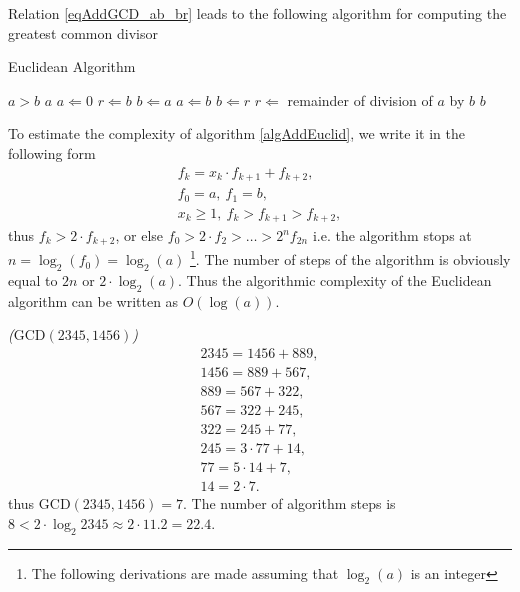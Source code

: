 Relation \eqref{eqAddGCD_ab_br} leads to the following algorithm
for computing the greatest common divisor
\begin{algorithm}
\caption{Euclidean Algorithm}
\begin{algorithmic}
    \STATE $a > b$
        \RETURN $a$
    \ENDIF
    \STATE $a \Leftarrow 0$
    \STATE $r \Leftarrow b$
    \STATE $b \Leftarrow a$
    \REPEAT
        \STATE $a \Leftarrow b$
        \STATE $b \Leftarrow r$
        \STATE $r \Leftarrow $ remainder of division of $a$ by $b$
    \RETURN $b$
\end{algorithmic}
\label{algAddEuclid}
\end{algorithm}

To estimate the complexity of algorithm \ref{algAddEuclid}, we write it in the following form 
\begin{eqnarray}
f_k = x_k \cdot f_{k + 1} + f_{k + 2},
\nonumber \\
f_0 = a, \: f_1 = b,
\nonumber \\
x_k \ge 1, \: f_k > f_{k+1} > f_{k + 2},
\nonumber
\end{eqnarray}
thus $f_k > 2 \cdot f_{k + 2}$, or else
$f_0 > 2 \cdot f_2 > \dots > 2^nf_{2n}$ i.e. the algorithm stops at
$n = \log_2\left(f_0\right) = \log_2\left(a\right)$
\footnote{The following derivations are made assuming that
  $\log_2\left(a\right)$ is an integer}. The number of steps
of the algorithm is obviously equal to $2n$ or 
$2 \cdot \log_2\left(a\right)$. Thus the algorithmic complexity
of the Euclidean algorithm can be written as 
$O\left(\log \left(a\right)\right)$.


\begin{example}
\emph{($\mbox{GCD}\left(2345,1456\right)$)}
\begin{eqnarray}
2345 = 1456 + 889,
\nonumber \\
1456 = 889 + 567,
\nonumber \\
889 = 567 + 322,
\nonumber \\
567 = 322 + 245,
\nonumber \\
322 = 245 + 77,
\nonumber \\
245 = 3 \cdot 77 + 14,
\nonumber \\
77 = 5 \cdot 14 + 7,
\nonumber \\
14 = 2 \cdot 7.
\nonumber
\end{eqnarray}
thus $\mbox{GCD}\left(2345,1456\right) = 7$. 
The number of algorithm steps is $8 < 2 \cdot \log_2{2345} \approx 2 \cdot 11.2 = 22.4$.
\nonumber
\end{example}

